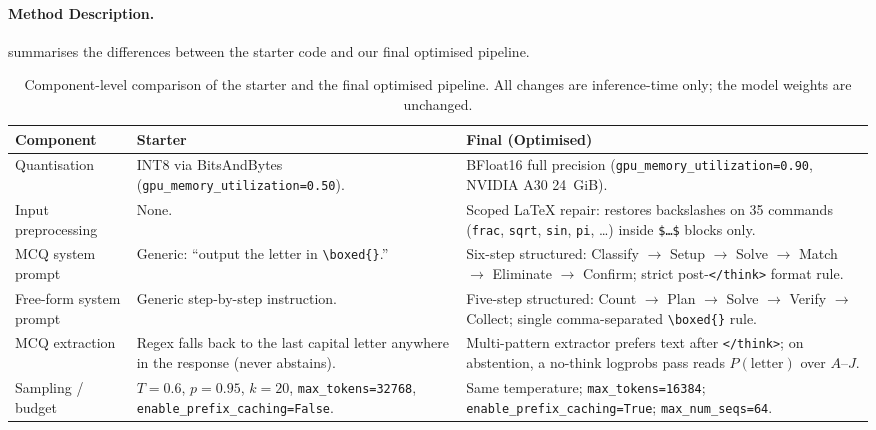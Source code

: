 \documentclass{article}
\begin{document}
\paragraph{Method Description.}
 summarises the differences between the starter code and
our final optimised pipeline.

\begin{table}[h]
  \caption{Component-level comparison of the starter and the final optimised
    pipeline. All changes are inference-time only; the model weights are
    unchanged.}
  \label{tab:changes}
  \centering
  \footnotesize
  \begin{tabular}{lp{4.3cm}p{4.3cm}}
    \toprule
    Component & Starter & Final (Optimised) \\
    \midrule
    Quantisation &
      INT8 via BitsAndBytes (\texttt{gpu\_memory\_utilization=0.50}). &
      BFloat16 full precision (\texttt{gpu\_memory\_utilization=0.90},
      NVIDIA A30 24~GiB). \\[3pt]
    Input preprocessing &
      None. &
      Scoped LaTeX repair: restores backslashes on 35 commands
      (\texttt{frac}, \texttt{sqrt}, \texttt{sin}, \texttt{pi}, \ldots)
      inside \texttt{\$\ldots\$} blocks only. \\[3pt]
    MCQ system prompt &
      Generic: ``output the letter in \texttt{\textbackslash boxed\{\}}.'' &
      Six-step structured: Classify $\to$ Setup $\to$ Solve $\to$ Match $\to$
      Eliminate $\to$ Confirm; strict post-\texttt{</think>} format rule. \\[3pt]
    Free-form system prompt &
      Generic step-by-step instruction. &
      Five-step structured: Count $\to$ Plan $\to$ Solve $\to$ Verify $\to$
      Collect; single comma-separated \texttt{\textbackslash boxed\{\}} rule. \\[3pt]
    MCQ extraction &
      Regex falls back to the last capital letter anywhere in the response
      (never abstains). &
      Multi-pattern extractor prefers text after \texttt{</think>};
      on abstention, a no-think logprobs pass reads $P(\text{letter})$
      over $A$--$J$. \\[3pt]
    Sampling / budget &
      $T{=}0.6$, $p{=}0.95$, $k{=}20$, \texttt{max\_tokens=32768},
      \texttt{enable\_prefix\_caching=False}. &
      Same temperature; \texttt{max\_tokens=16384};
      \texttt{enable\_prefix\_caching=True};
      \texttt{max\_num\_seqs=64}. \\
    \bottomrule
  \end{tabular}
\end{table}
\end{document}
